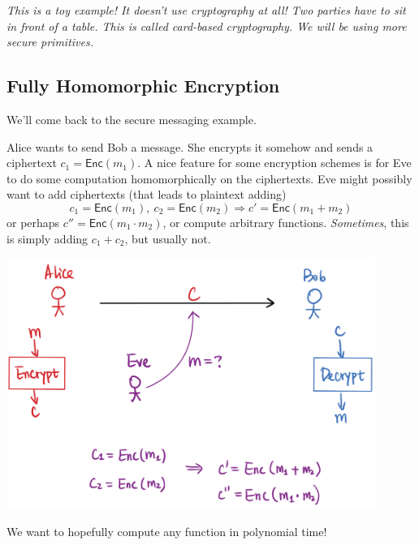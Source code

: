 \emph{This is a toy example! It doesn't use cryptography at all! Two parties have to sit in front of a table. This is called card-based cryptography. We will be using more secure primitives.}

\subsection{Fully Homomorphic Encryption}
We'll come back to the secure messaging example.

Alice wants to send Bob a message. She encrypts it somehow and sends a ciphertext $c_1 = \mathsf{Enc}(m_1)$. A nice feature for some encryption schemes is for Eve to do some computation homomorphically on the ciphertexts. Eve might possibly want to add ciphertexts (that leads to plaintext adding)
\[c_1 = \mathsf{Enc}(m_1),\ c_2 = \mathsf{Enc}(m_2)\Rightarrow c' = \mathsf{Enc}(m_1 + m_2)\]
or perhaps $c'' = \mathsf{Enc}(m_1\cdot m_2)$, or compute arbitrary functions. \emph{Sometimes}, this is simply adding $c_1 + c_2$, but usually not.

\begin{center}
    \includegraphics[width=0.9\textwidth]{images/2023-01-26/homomorphic_encryption.png}
\end{center}

We want to hopefully compute any function in polynomial time!


